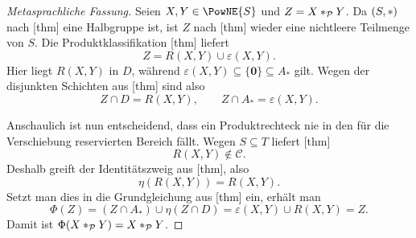 \documentclass[main.tex]{subfiles}
\begin{document}
\begin{proof}[Metasprachliche Fassung]
Seien \(X,Y\in\PowNE{S}\) und \(Z=X\mathbin{\ast}_{\mathcal P}Y\). Da
\((S,\mathbin{\ast})\) nach
[thm] eine Halbgruppe ist,
ist \(Z\) nach [thm] wieder eine
nichtleere Teilmenge von \(S\). Die Produktklassifikation
[thm] liefert
\[
  Z=R(X,Y)\cup\varepsilon(X,Y).
\]
Hier liegt \(R(X,Y)\) in \(D\), während
\(\varepsilon(X,Y)\subseteq\{\mathbf0\}\subseteq A_*\) gilt. Wegen der
disjunkten Schichten aus
[thm] sind also
\[
  Z\cap D=R(X,Y),
  \qquad
  Z\cap A_*=\varepsilon(X,Y).
\]

Anschaulich ist nun entscheidend, dass ein Produktrechteck nie in den für
die Verschiebung reservierten Bereich fällt. Wegen \(S\subseteq T\) liefert
[thm]
\[
  R(X,Y)\notin\mathcal C.
\]
Deshalb greift der Identitätszweig aus
[thm], also
\[
  \eta(R(X,Y))=R(X,Y).
\]
Setzt man dies in die Grundgleichung aus
[thm] ein, erhält man
\[
  \Phi(Z)
  =(Z\cap A_*)\cup\eta(Z\cap D)
  =\varepsilon(X,Y)\cup R(X,Y)
  =Z.
\]
Damit ist
\(\Phi(X\mathbin{\ast}_{\mathcal P}Y)=X\mathbin{\ast}_{\mathcal P}Y\).
\end{proof}
\end{document}
